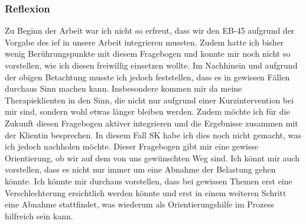 \subsubsection{Reflexion}
Zu Beginn der Arbeit war ich nicht so erfreut, dass wir den EB-45 aufgrund der Vorgabe des \ac{ief} in unsere Arbeit integrieren mussten. Zudem hatte ich bisher wenig Berührungspunkte mit diesem Fragebogen und konnte mir noch nicht so vorstellen, wie ich diesen freiwillig einsetzen wollte. Im Nachhinein und aufgrund der obigen Betachtung musste ich jedoch feststellen, dass es in gewissen Fällen durchaus Sinn machen kann. Insbesondere kommen mir da meine Therapieklienten in den Sinn, die nicht nur aufgrund einer Kurzintervention bei mir sind, sondern wohl etwas länger bleiben werden. Zudem möchte ich für die Zukunft diesen Fragebogen aktiver integrieren und die Ergebnisse zusammen mit der Klientin besprechen. In diesem Fall SK habe ich dies noch nicht gemacht, was ich jedoch nachholen möchte. Dieser Fragebogen gibt mir eine gewisse Orientierung, ob wir auf dem von uns gewünschten Weg sind. Ich könnt mir auch vorstellen, dass es nicht nur immer um eine Abnahme der Belastung gehen könnte. Ich könnte mir durchaus vorstellen, dass bei gewissen Themen erst eine Verschlechterung ersichtlich werden könnte und erst in einem weiteren Schritt eine Abnahme stattfindet, was wiederum als Orientierungshilfe im Prozess hilfreich sein kann.  









 